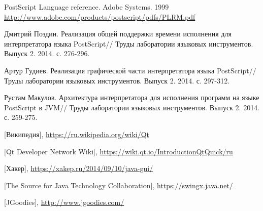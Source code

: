 \documentclass[14pt]{extarticle}
\begin{document}
	
	\pagebreak

	
	\begin{thebibliography}{}
		
		PostScript Language reference. Adobe Systems. 1999\\
		\url{http://www.adobe.com/products/postscript/pdfs/PLRM.pdf}

		Дмитрий Поздин. Реализация общей поддержки времени исполнения для интерпретатора языка PostScript// Труды лаборатории языковых инструментов. Выпуск 2. 2014. с. 276-296.
		
		Артур Гудиев.
		Реализация графической части интерпретатора языка PostScript// Труды лаборатории языковых инструментов. Выпуск 2. 2014. с. 297-312.

		Рустам Макулов.
		Архитектура интерпретатора для исполнения программ на языке PostScript в JVM// Труды лаборатории языковых инструментов. Выпуск 2. 2014. с. 259-275.
			
		[Википедия], 
		\url{https://ru.wikipedia.org/wiki/Qt}			
				
		[Qt Developer Network Wiki], 
		\url{https://wiki.qt.io/IntroductionQtQuick/ru}
		
		[Хакер], \url{https://xakep.ru/2014/09/10/java-gui/}
		
		
		[The Source for Java Technology Collaboration], \url{https://swingx.java.net/}
		
		
		[JGoodies], \url{http://www.jgoodies.com/}
		
	\end{thebibliography}
\end{document}
